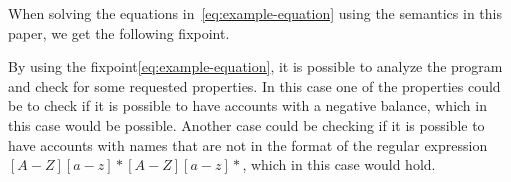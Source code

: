     When solving the equations in~\ref{eq:example-equation} using the semantics in this paper, we get the following fixpoint.



By using the fixpoint\ref{eq:example-equation}, it is possible to analyze the program and check for some requested properties.
In this case one of the properties could be to check if it is possible to have accounts with a negative balance, which in this case would be possible.
Another case could be checking if it is possible to have accounts with names that are not in the format of the regular expression $[A-Z][a-z]* [A-Z][a-z]*$, which in this case would hold.